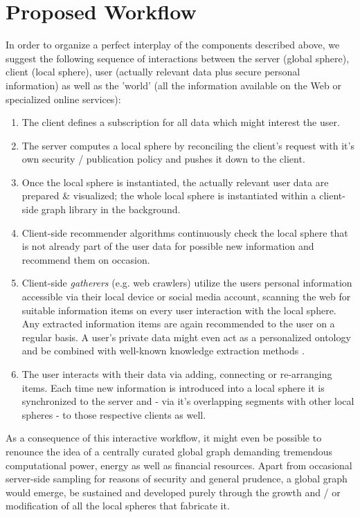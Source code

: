 \documentclass{llncs}
\begin{document}

\section{Proposed Workflow}
\label{sect:workflow}

In order to organize a perfect interplay of the components described above, we suggest the following sequence of interactions between the server (global sphere), client (local sphere), user (actually relevant data plus secure personal information) as well as the 'world' (all the information available on the Web or specialized online services):

\begin{enumerate}
	\item The client defines a subscription for all data which might interest the user.
	\item The server computes a local sphere by reconciling the client's request with it's own security / publication policy and pushes it down to the client.
	\item Once the local sphere is instantiated, the actually relevant user data are prepared \& visualized; the whole local sphere is instantiated within a client-side graph library in the background.
	\item Client-side recommender algorithms continuously check the local sphere that is not already part of the user data for possible new information and recommend them on occasion.
	\item Client-side \textit{gatherers} (e.g. web crawlers) utilize the users personal information accessible via their local device or social media account, scanning the web for suitable information items on every user interaction with the local sphere. Any extracted information items are again recommended to the user on a regular basis. A user's private data might even act as a personalized ontology and be combined with well-known knowledge extraction methods \cite{2003automaticKEfromWebDocuments}.
	\item The user interacts with their data via adding, connecting or re-arranging items. Each time new information is introduced into a local sphere it is synchronized to the server and - via it's overlapping segments with other local spheres - to those respective clients as well.
\end{enumerate}

As a consequence of this interactive workflow, it might even be possible to renounce the idea of a centrally curated global graph demanding tremendous computational power, energy as well as financial resources. Apart from occasional server-side sampling for reasons of security and general prudence, a global graph would emerge, be sustained and developed purely through the growth and / or modification of all the local spheres that fabricate it.
\end{document}
